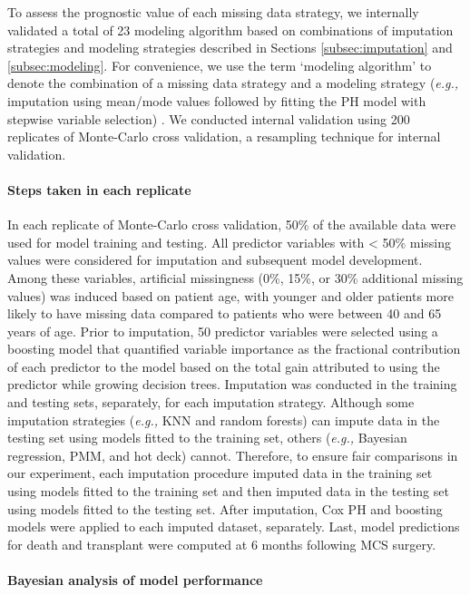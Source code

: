 \documentclass{article}
\begin{document}
\label{subsec:internal}

To assess the prognostic value of each missing data strategy, we
internally validated a total of 23 modeling algorithm based on
combinations of imputation strategies and modeling strategies described
in Sections \ref{subsec:imputation} and \ref{subsec:modeling}. For
convenience, we use the term `modeling algorithm' to denote the
combination of a missing data strategy and a modeling strategy
(\textit{e.g., } imputation using mean/mode values followed by fitting
the PH model with stepwise variable selection) \cite{kuhn2013applied}.
We conducted internal validation using 200 replicates of Monte-Carlo
cross validation, a resampling technique for internal validation.

\paragraph{Steps taken in each replicate}

In each replicate of Monte-Carlo cross validation, 50\% of the available
data were used for model training and testing. All predictor variables
with \textless{} 50\% missing values were considered for imputation and
subsequent model development. Among these variables, artificial
missingness (0\%, 15\%, or 30\% additional missing values) was induced
based on patient age, with younger and older patients more likely to
have missing data compared to patients who were between 40 and 65 years
of age. Prior to imputation, 50 predictor variables were selected using
a boosting model that quantified variable importance as the fractional
contribution of each predictor to the model based on the total gain
attributed to using the predictor while growing decision trees.
Imputation was conducted in the training and testing sets, separately,
for each imputation strategy. Although some imputation strategies
(\textit{e.g., } KNN and random forests) can impute data in the testing
set using models fitted to the training set, others
(\textit{e.g., } Bayesian regression, PMM, and hot deck) cannot.
Therefore, to ensure fair comparisons in our experiment, each imputation
procedure imputed data in the training set using models fitted to the
training set and then imputed data in the testing set using models
fitted to the testing set. After imputation, Cox PH and boosting models
were applied to each imputed dataset, separately. Last, model
predictions for death and transplant were computed at 6 months following
MCS surgery.

\paragraph{Bayesian analysis of model performance}
\end{document}
